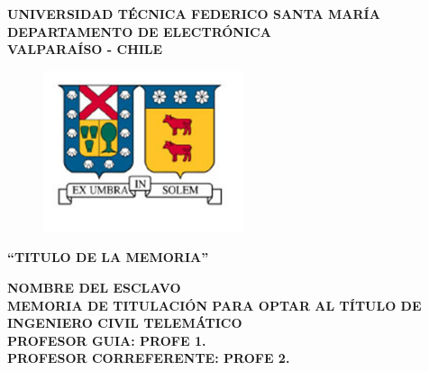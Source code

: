 \documentclass[12pt,spanish,twoside]{thesis}
\begin{document}
\thispagestyle{empty}

\begin{center}
\linespread{1.15}
\textbf{\large{UNIVERSIDAD TÉCNICA FEDERICO SANTA MARÍA\\}
\normalsize{DEPARTAMENTO DE ELECTRÓNICA\\VALPARAÍSO - CHILE\\}}

\vspace{0.5cm}
\begin{figure}[H]
\centering
  \includegraphics[width=5.85cm]{fig/usmLogo}
\end{figure}
\vspace{0.5cm}

\linespread{1}\hangindent=0cm
\textbf{\Large ``TITULO DE LA MEMORIA''\\}
\vspace{3cm}

\hangindent=0cm\large \textbf{NOMBRE DEL ESCLAVO}\\
\vspace{0.5cm}
\hangindent=0cm\normalsize \textbf{MEMORIA DE TITULACIÓN PARA OPTAR AL TÍTULO DE INGENIERO CIVIL TELEMÁTICO}\\
\vspace{1cm}
\hangindent=0cm\normalsize \textbf{PROFESOR GUIA: \hspace{2cm} PROFE 1.}\\
\vspace{0.5cm}
\hangindent=0cm\normalsize \textbf{PROFESOR CORREFERENTE: \hspace{2cm} PROFE 2.}\\

\end{center}
\thispagestyle{empty}

\newpage 
\thispagestyle{empty}

\renewcommand\headrulewidth{0pt}

\end{document}
